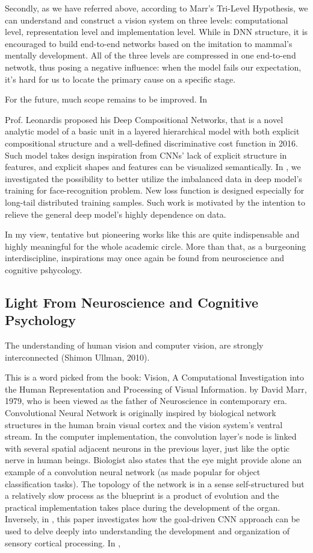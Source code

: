 Secondly, as we have referred above, according to {Marr's Tri-Level Hypothesis}, we can understand and construct a vision system on three levels: computational level, representation level and implementation level. While in {DNN} structure, it is encouraged to build end-to-end networks based on the imitation to mammal's mentally development. All of the three levels are compressed in one end-to-end netwotk, thus posing a negative influence: when the model fails our expectation, it's hard for us to locate the primary cause on a specific stage.

For the future, much scope remains to be improved. In {{\cite{tabernik2016towards} Prof. Leonardis} proposed his {Deep Compositional Networks}, that is a novel analytic model
of a basic unit in a layered hierarchical model with both
explicit compositional structure and a well-defined discriminative cost function in {2016}. Such model takes design inspiration from CNNs' lack of explicit structure in features, and explicit shapes and features can be visualized semantically. 
In {\cite{zhang2016range}}, we investigated the possibility to better utilize the imbalanced data in deep model's training for face-recognition problem. New loss function is designed especially for long-tail distributed training samples. Such work is motivated by the intention to relieve the general deep model's highly dependence on data.

In my view, tentative but pioneering works like this are quite indispensable and highly meaningful for the whole academic circle. More than that, as a burgeoning interdiscipline, inspirations may once again be found from neuroscience and cognitive pshycology.


\subsection{Light From Neuroscience and Cognitive Psychology}}
The understanding of human vision and computer vision, are strongly interconnected ({{Shimon Ullman, 2010}}).

This is a word picked from the book: {Vision, A Computational Investigation into the Human Representation and Processing of Visual Information.} by {David Marr, 1979}, who is been viewed as the father of {Neuroscience} in contemporary era. {Convolutional Neural Network}
is originally inspired by biological network structures in the human brain visual cortex and the vision system's ventral stream\cite{morgan2007development}. In the computer implementation, the convolution layer's node is linked with several spatial adjacent neurons in the previous layer, just like the optic nerve in human beings. Biologist also states that the eye might provide alone an example of a {convolution neural network} (as made popular for object classification tasks). The topology of the network is in a sense self-structured but a relatively slow process as the {blueprint} is a product of evolution and the practical implementation takes place during the development of the organ.  Inversely, in \cite{yamins2016using}, this paper investigates how the goal-driven CNN approach can be used to delve deeply into understanding the development and organization of sensory cortical processing. In \cite{wang2017multi}, 

